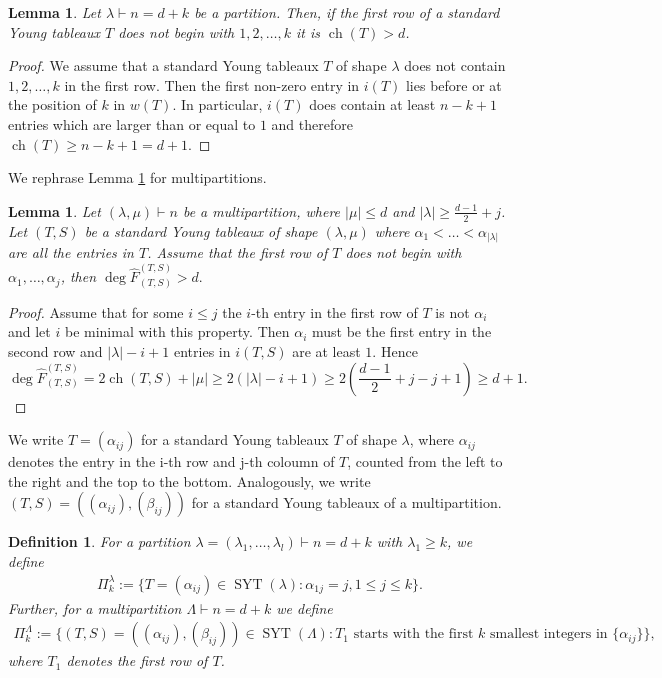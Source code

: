 \documentclass[11pt,a4paper]{amsart}
\numberwithin{equation}{section}
\newtheorem{lemma}[thm]{Lemma}
\newtheorem{definition}[thm]{Definition}
\theoremstyle{definition}
\DeclareMathOperator{\ch}{ch}
\DeclareMathOperator{\SYT}{SYT}
\numberwithin{thm}{section}
\theoremstyle{break}
\numberwithin{subcase}{case}
\begin{document}
\begin{lemma} \label{le:lemma1}
Let $\lambda \vdash n=d+k$ be a partition. Then, if the first row of a standard Young tableaux $T$ does not begin with $1,2,\ldots,k$ it is $\ch (T) > d$.
\end{lemma}
\begin{proof}
We assume that a standard Young tableaux $T$ of shape $\lambda$ does not contain $1,2,\ldots,k$ in the first row. Then the first non-zero entry in $i(T)$ lies before or at the position of $k$ in $w(T)$. In particular, $i(T)$ does contain at least $n-k+1$ entries which are larger than or equal to $1$ and therefore $\ch  (T) \geq n-k+1=d+1$. 
\end{proof}
We rephrase Lemma \ref{le:lemma1} for multipartitions.
\begin{lemma}\label{le:lemma2}
Let $(\lambda,\mu) \vdash n$ be a multipartition, where $|\mu| \leq d$ and $|\lambda|\geq  \frac{d-1}{2}  +j$. Let $(T,S)$ be a standard Young tableaux of shape $(\lambda,\mu)$ where $\alpha_1< \ldots < \alpha_{|\lambda|}$ are all the entries in $T$. Assume that the first row of $T$ does not begin with $\alpha_1, \ldots ,\alpha_j$, then $\deg \widehat{F}^{(T,S)}_{(T,S)} > d.$
\end{lemma}
\begin{proof}
Assume that for some $i \leq j$ the $i$-th entry in the first row of $T$ is not $\alpha_i$ and let $i$ be minimal with this property. Then $\alpha_i$ must be the first entry in the second row and $|\lambda|-i+1$ entries in $i(T,S)$ are at least $1$. Hence $$ \deg \widehat{F}^{(T,S)}_{(T,S)} = 2 \ch (T,S) + |\mu| \geq 2(|\lambda|-i+1) \geq 2\left(  \frac{d-1}{2}  +j-j+1\right) \geq d+1.$$
\end{proof}

We write $T=(\alpha_{ij})$ for a standard Young tableaux $T$ of shape $\lambda$, where $\alpha_{ij}$ denotes the entry in the i-th row and j-th coloumn of $T$, counted from the left to the right and the top to the bottom. Analogously, we write $(T,S)=\left( (\alpha_{ij}), (\beta_{ij})\right)$ for a standard Young tableaux of a multipartition.

\begin{definition}
For a partition $\lambda=(\lambda_1,\ldots,\lambda_l) \vdash n=d+k$ with $\lambda_1 \geq k$, we define 
\begin{align*}
    \Pi_k^\lambda := \{ T=(\alpha_{ij}) \in \SYT (\lambda) : \alpha_{1j}=j, 1 \leq j \leq k \}.
\end{align*}
Further, for a multipartition $\Lambda \vdash n=d+k$ we define
\begin{align*}
    \Pi_{k}^\Lambda := \{ (T,S) = ((\alpha_{ij}),(\beta_{ij})) \in \SYT ( \Lambda) : T_1\text{ starts with the first $k$ smallest integers in } \{\alpha_{ij}\} \},
\end{align*}
where $T_1$ denotes the first row of $T$.
\end{definition}
\end{document}
